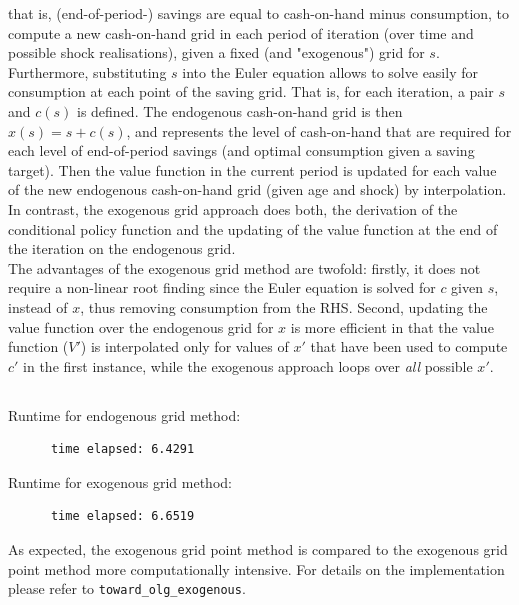 \documentclass[12pt,a4paper]{article}
\begin{document}
that is, (end-of-period-) savings are equal to cash-on-hand minus consumption, to compute a new cash-on-hand grid in each period of iteration (over time and possible shock realisations), given a fixed (and "exogenous") grid for $s$. Furthermore, substituting $s$ into the Euler equation allows to solve easily for consumption at each point of the saving grid. That is, for each iteration, a pair $s$ and $c(s)$ is defined. The endogenous cash-on-hand grid is then $x(s) = s + c(s)$, and represents the level of cash-on-hand that are required for each level of end-of-period savings (and optimal consumption given a saving target). Then the value function in the current period is updated for each value of the new endogenous cash-on-hand grid (given age and shock) by interpolation.
\\
In contrast, the exogenous grid approach does both, the derivation of the conditional policy function and the updating of the value function at the end of the iteration on the endogenous grid.
\\
The advantages of the exogenous grid method are twofold: firstly, it does not require a non-linear root finding since the Euler equation is solved for $c$ given $s$, instead of $x$, thus removing consumption from the RHS. Second, updating the value function over the endogenous grid for $x$ is more efficient in that the value function ($V'$) is interpolated only for values of $x'$ that have been used to compute $c'$ in the first instance, while the exogenous approach loops over \textit{all} possible $x'$.

\subsection{}

Runtime for endogenous grid method:
  \begin{lstlisting}
      time elapsed: 6.4291
  \end{lstlisting}

Runtime for exogenous grid method:
  \begin{lstlisting}
      time elapsed: 6.6519
  \end{lstlisting}

As expected, the exogenous grid point method is compared to the exogenous grid point method more computationally intensive.
For details on the implementation please refer to \texttt{toward\_olg\_exogenous}.

\subsection{}
\end{document}
